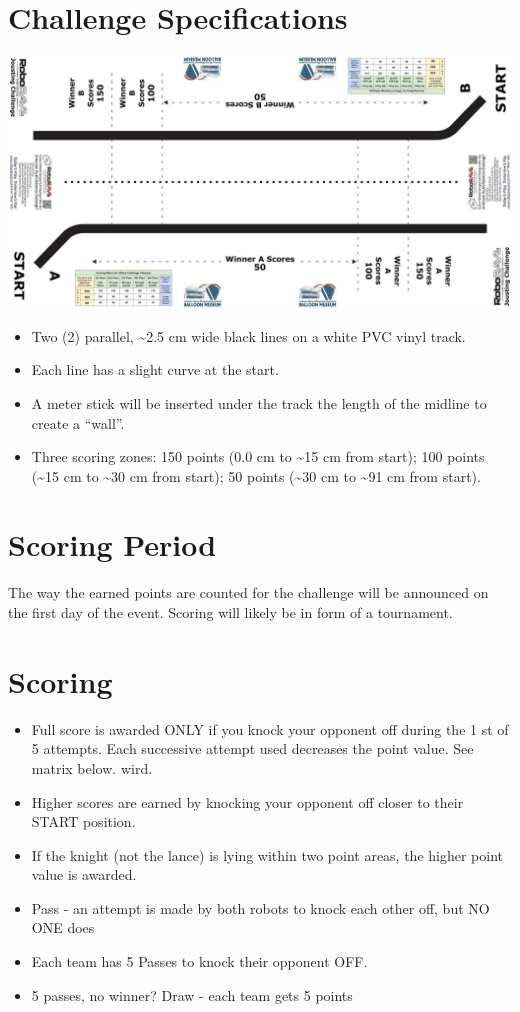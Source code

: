 \documentclass[a4paper,12pt]{article}
\begin{document}
\section{Challenge Specifications}
\includegraphics[width=1\textwidth]{track.png}
\begin{itemize}
	\item Two (2) parallel, \textasciitilde2.5 cm wide black lines on a white PVC vinyl track.
	\item Each line has a slight curve at the start.
	\item A meter stick will be inserted under the track the length of the midline to create a “wall”.
	\item Three scoring zones: 150 points (0.0 cm to \textasciitilde15 cm from start); 100 points (\textasciitilde15 cm to \textasciitilde30 cm
	from start); 50 points (\textasciitilde30 cm to \textasciitilde91 cm from start).
\end{itemize}
\section{Scoring Period}
\par The way the earned points are counted for the challenge will be announced on the first day of the event. Scoring will likely be in form of a tournament.
\section{Scoring}
\begin{itemize}
\item Full score is awarded ONLY if you knock your opponent off during the 1 st of 5 attempts. Each successive attempt used decreases the point value. See matrix below.
wird.
\item Higher scores are earned by knocking your opponent off closer to their START position.
\item If the knight (not the lance) is lying within two point areas, the higher point value is awarded.
\item Pass - an attempt is made by both robots to knock each other off, but NO
ONE does
\item Each team has 5 Passes to knock their opponent OFF.
\item 5 passes,
no
winner?
Draw -
each
team gets
5 points
\end{itemize}
\end{document}
